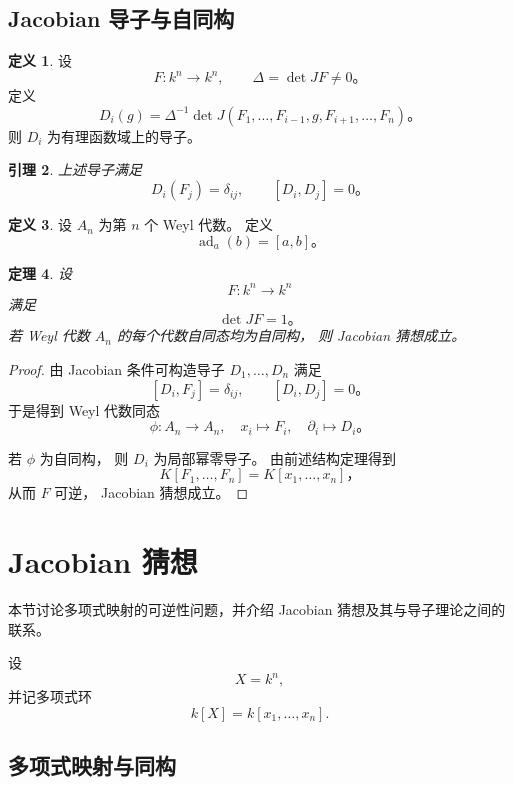 \documentclass[11pt]{article}
\theoremstyle{plain}
\newtheorem{theorem}{定理}[section]
\newtheorem{lemma}[theorem]{引理}
\theoremstyle{definition}
\newtheorem{definition}[theorem]{定义}
\theoremstyle{remark}
\renewcommand{\det}{\operatorname{det}}
\begin{document}
\subsection{Jacobian 导子与自同构}
\begin{definition}
    设
    \[
        F:k^n\to k^n,
        \qquad
        \Delta=\det JF\neq0。
    \]
    定义
    \[
        D_i(g)
        =
        \Delta^{-1}
        \det
        J(F_1,\dots,F_{i-1},g,F_{i+1},\dots,F_n)。
    \]
    则 $D_i$ 为有理函数域上的导子。
\end{definition}
\begin{lemma}
    上述导子满足
    \[
        D_i(F_j)=\delta_{ij},
        \qquad
        [D_i,D_j]=0。
    \]
\end{lemma}
\begin{definition}
    设 $A_n$ 为第 $n$ 个 Weyl 代数。
    定义
    \[
        \operatorname{ad}_a(b)=[a,b]。
    \]
\end{definition}
\begin{theorem}
    设
    \[
        F:k^n\to k^n
    \]
    满足
    \[
        \det JF=1。
    \]
    若 Weyl 代数 $A_n$ 的每个代数自同态均为自同构，
    则 Jacobian 猜想成立。
\end{theorem}
\begin{proof}
    由 Jacobian 条件可构造导子
    $D_1,\dots,D_n$
    满足
    \[
        [D_i,F_j]=\delta_{ij},
        \qquad
        [D_i,D_j]=0。
    \]
    于是得到 Weyl 代数同态
    \[
        \phi:A_n\to A_n,
        \quad
        x_i\mapsto F_i,
        \quad
        \partial_i\mapsto D_i。
    \]

    若 $\phi$ 为自同构，
    则 $D_i$ 为局部幂零导子。
    由前述结构定理得到
    \[
        K[F_1,\dots,F_n]
        =
        K[x_1,\dots,x_n]，
    \]
    从而 $F$ 可逆，
    Jacobian 猜想成立。
\end{proof}










\section{Jacobian 猜想}

本节讨论多项式映射的可逆性问题，并介绍
Jacobian 猜想及其与导子理论之间的联系。

设
\[
    X=k^n,
\]
并记多项式环
\[
    k[X]=k[x_1,\dots,x_n].
\]

\subsection{多项式映射与同构}
\end{document}
